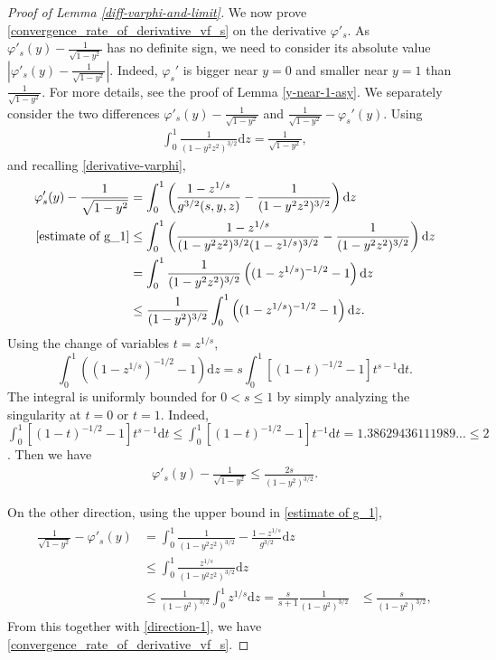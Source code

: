 \documentclass[reqno,10pt]{amsart}
\let\vf=\varphi
\newcommand{\ben}{\begin{eqnarray}}
\newcommand{\een}{\end{eqnarray}}
\newcommand{\beno}{\begin{eqnarray*}}
\newcommand{\eeno}{\end{eqnarray*}}
\theoremstyle{definition}
\numberwithin{equation}{section}
\begin{document}
\begin{proof}[Proof of Lemma \ref{diff-varphi-and-limit}]
    We now prove \eqref{convergence_rate_of_derivative_vf_s} on the derivative $\vf'_s$. As 
    $\vf'_s(y)-\frac{1}{\sqrt{1-y^2}}$ has no definite sign, we need to consider its absolute value 
    $|\vf'_s(y)-\frac{1}{\sqrt{1-y^2}}|$. Indeed,  $\vf_s'$ is bigger near $y=0$ and smaller near $y=1$ than $\frac{1}{\sqrt{1-y^2}}$. For more details, see the proof of Lemma 
    \ref{y-near-1-asy}. We separately consider the two differences $\vf'_s(y)-\frac{1}{\sqrt{1-y^2}}$
    and $\frac{1}{\sqrt{1-y^2}}-\vf_s'(y)$. Using
    \ben\label{expression1}
    \int_{0}^{1}\frac{1}{(1-y^{2}z^{2})^{3/2}}\mathrm{d}z=\frac{1}{\sqrt{1-y^2}},
    \een
    and recalling \eqref{derivative-varphi}, 
    $$
    \begin{aligned}
        \vf'_s(y)-\frac{1}{\sqrt{1-y^2}}&= \int_{0}^{1} \left( \frac{1-z^{1/s}}{g^{3/2}(s,y,z)}-\frac{1}{(1-y^{2}z^2)^{3/2}} \right) \mathrm{d}z \\
     \eqref{estimate of g_1}    &\leq  \int_{0}^{1} \left( \frac{1-z^{1/s}}{(1-y^{2}z^2)^{3/2}(1-z^{1/s})^{3/2}}-\frac{1}{(1-y^{2}z^2)^{3/2}} \right) \mathrm{d}z \\
        & =
       \int_{0}^{1} \frac{1}{(1-y^2 z^2)^{3/2}} \left((1-z^{1/s})^{-1/2}-1\right)\mathrm{d}z\\
        & \leq
        \frac{1}{(1-y^2)^{3/2}}\int_{0}^{1} \left((1-z^{1/s})^{-1/2}-1\right)\mathrm{d}z.  
    \end{aligned}
    $$
    Using the change of variables $t=z^{1/s}$,
    $$\int_{0}^{1}\left((1-z^{1/s})^{-1/2}-1\right)\mathrm{d}z=s\int_{0}^{1}[(1-t)^{-1/2}-1]t^{s-1}\mathrm{d}t.$$
  The integral is uniformly bounded for $0<s \leq 1$ by simply analyzing the singularity at $t=0$ or $t=1$. Indeed, $\int_{0}^{1}[(1-t)^{-1/2}-1]t^{s-1}\mathrm{d}t\le \int_{0}^{1}[(1-t)^{-1/2}-1]t^{-1}\mathrm{d}t=1.38629436111989...\le 2$. Then we have
  \ben \label{direction-1}
    	\vf'_s(y)-\frac{1}{\sqrt{1-y^2}} \leq
    	\frac{2s}{(1-y^2)^{3/2}}.  
    \een

    On the other direction, using the upper bound in \eqref{estimate of g_1},
    \beno
    \begin{aligned}
        \frac{1}{\sqrt{1-y^2}}-\vf'_s(y)&=\int_{0}^{1}\frac{1}{(1-y^{2}z^{2})^{3/2}}-\frac{1-z^{1/s}}{g^{3/2}}\mathrm{d}z\\
        &\leq
        \int_{0}^{1}\frac{z^{1/s}}{(1-y^{2}z^{2})^{3/2}}\mathrm{d}z\\
        & \le
        \frac{1}{(1-y^2)^{3/2}}\int_{0}^{1}z^{1/s}\mathrm{d}z = \frac{s}{s+1} \frac{1}{(1-y^2)^{3/2}}
        & \leq \frac{s}{(1-y^2)^{3/2}},
    \end{aligned}
\eeno
From this together with \eqref{direction-1}, we have \eqref{convergence_rate_of_derivative_vf_s}.
\end{proof}
\end{document}
